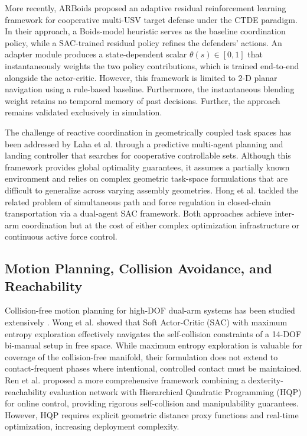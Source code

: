 \documentclass[a4paper,fleqn]{cas-dc}
\begin{document}
More recently, ARBoids \cite{arboids} proposed an adaptive residual reinforcement learning framework for cooperative multi-USV target defense under the CTDE paradigm. In their approach, a Boids-model heuristic serves as the baseline coordination policy, while a SAC-trained residual policy refines the defenders' actions. An adapter module produces a state-dependent scalar $\theta(s) \in [0,1]$ that instantaneously weights the two policy contributions, which is trained end-to-end alongside the actor-critic. However, this framework is limited to 2-D planar navigation using a rule-based baseline. Furthermore, the instantaneous blending weight retains no temporal memory of past decisions. Further, the approach remains validated exclusively in simulation.

The challenge of reactive coordination in geometrically coupled task spaces has been addressed by Laha et al. \cite{related-45} through a predictive multi-agent planning and landing controller that searches for cooperative controllable sets. Although this framework provides global optimality guarantees, it assumes a partially known environment and relies on complex geometric task-space formulations that are difficult to generalize across varying assembly geometries. Hong et al. \cite{related-46} tackled the related problem of simultaneous path and force regulation in closed-chain transportation via a dual-agent SAC framework. Both approaches achieve inter-arm coordination but at the cost of either complex optimization infrastructure or continuous active force control.

\subsection{Motion Planning, Collision Avoidance, and Reachability}
Collision-free motion planning for high-DOF dual-arm systems has been studied extensively \cite{sksp}. Wong et al. \cite{related-47} showed that Soft Actor-Critic (SAC) with maximum entropy exploration effectively navigates the self-collision constraints of a 14-DOF bi-manual setup in free space. While maximum entropy exploration is valuable for coverage of the collision-free manifold, their formulation does not extend to contact-frequent phases where intentional, controlled contact must be maintained. Ren et al. \cite{related-48} proposed a more comprehensive framework combining a dexterity-reachability evaluation network with Hierarchical Quadratic Programming (HQP) for online control, providing rigorous self-collision and manipulability guarantees. However, HQP requires explicit geometric distance proxy functions and real-time optimization, increasing deployment complexity.
\end{document}
